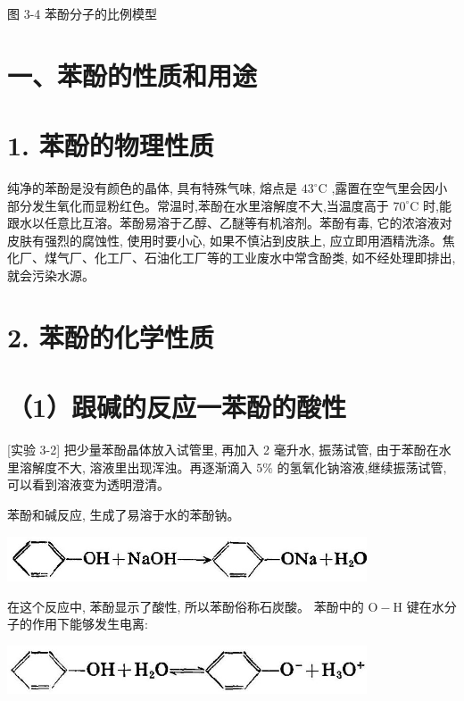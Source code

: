 \documentclass[10pt]{article}
\begin{document}
图 3-4 苯酚分子的比例模型

\section*{一、苯酚的性质和用途}

\section*{1. 苯酚的物理性质}

纯净的苯酚是没有颜色的晶体, 具有特殊气味, 熔点是 \({43}^{ \circ }\mathrm{C}\) ,露置在空气里会因小部分发生氧化而显粉红色。常温时,苯酚在水里溶解度不大,当温度高于 \({70}^{ \circ }\mathrm{C}\) 时,能跟水以任意比互溶。苯酚易溶于乙醇、乙醚等有机溶剂。苯酚有毒, 它的浓溶液对皮肤有强烈的腐蚀性, 使用时要小心, 如果不慎沾到皮肤上, 应立即用酒精洗涤。焦化厂、煤气厂、化工厂、石油化工厂等的工业废水中常含酚类, 如不经处理即排出, 就会污染水源。

\section*{2. 苯酚的化学性质}

\section*{（1）跟碱的反应一苯酚的酸性}

[实验 3-2] 把少量苯酚晶体放入试管里, 再加入 2 毫升水, 振荡试管, 由于苯酚在水里溶解度不大, 溶液里出现浑浊。再逐渐滴入 \(5\%\) 的氢氧化钠溶液,继续振荡试管,可以看到溶液变为透明澄清。

苯酚和碱反应, 生成了易溶于水的苯酚钠。

\begin{center}
\includegraphics[max width=0.8\textwidth]{images/01912d16-be99-77bb-9535-4f3ed8d9946f_123_753684.jpg}
\end{center}

在这个反应中, 苯酚显示了酸性, 所以苯酚俗称石炭酸。 苯酚中的 \(\mathrm{O} - \mathrm{H}\) 键在水分子的作用下能够发生电离:

\begin{center}
\includegraphics[max width=0.8\textwidth]{images/01912d16-be99-77bb-9535-4f3ed8d9946f_123_323066.jpg}
\end{center}
\end{document}
